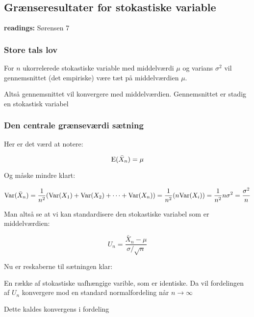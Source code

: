 \subsection{Grænseresultater for stokastiske variable}

\textbf{readings:}  Sørensen 7

\subsubsection{Store tals lov}

For $n$ ukorrelerede stokastiske variable med middelværdi $\mu$ og varians $\sigma^2$ vil gennemsnittet (det empiriske) være tæt på middelværdien $\mu$.

Altså gennemsnittet vil konvergere med middelværdien. Gennemsnittet er stadig en stokastisk variabel

\subsubsection{Den centrale grænseværdi sætning}

Her er det værd at notere:

\begin{equation}
    \text{E}(\bar{X}_n) = \mu
\end{equation}

Og måske mindre klart:

\begin{equation}
    \text{Var}(\bar{X}_n) = \frac{1}{n^2} ( \text{Var}(X_1) + \text{Var}(X_2) + \cdots + \text{Var}(X_n)) = \frac{1}{n^2}(n \text{Var}(X_i)) = \frac{1}{n^2} n \sigma^2 = \frac{\sigma^2}{n}
\end{equation}

Man altså se at vi kan standardisere den stokastiske variabel som er middelværdien:

\begin{equation}
    U_n = \frac{\bar{X}_n - \mu}{\sigma / \sqrt{n}}
\end{equation}

Nu er reskaberne til sætningen klar:

En række af stokastiske uafhængige varible, som er identiske. Da vil fordelingen af $U_n$ konvergere mod en standard normalfordeling når $n\rightarrow \infty$

Dette kaldes konvergens i fordeling
